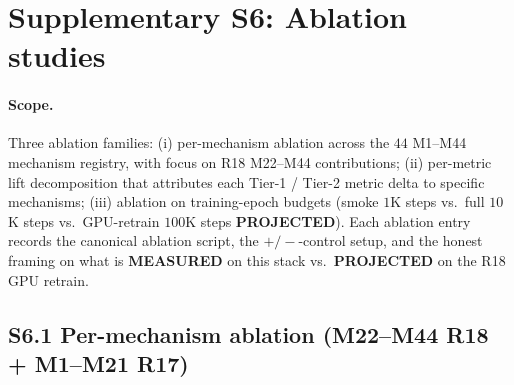 %

\section*{Supplementary S6: Ablation studies}

\providecommand{\MEASURED}{\textbf{MEASURED}}
\providecommand{\PROJECTED}{\textbf{PROJECTED}}
\providecommand{\DESIGN}{\textbf{DESIGN}}
\providecommand{\CITEDONLY}{\textbf{CITED-ONLY}}

\paragraph{Scope.}
Three ablation families: (i) per-mechanism ablation across the
$44$ M1--M44 mechanism registry, with focus on R18 M22--M44
contributions; (ii) per-metric lift decomposition that attributes
each Tier-1 / Tier-2 metric delta to specific mechanisms; (iii)
ablation on training-epoch budgets (smoke $1$K steps vs.\
full $10$K steps vs.\ GPU-retrain $100$K steps \PROJECTED{}).
Each ablation entry records the canonical ablation script, the
$+/-$-control setup, and the honest framing on what is
\MEASURED{} on this stack vs.\ \PROJECTED{} on the R18 GPU
retrain.

\subsection*{S6.1 Per-mechanism ablation (M22--M44 R18 + M1--M21 R17)}
\label{supp:s6-per-mech}

